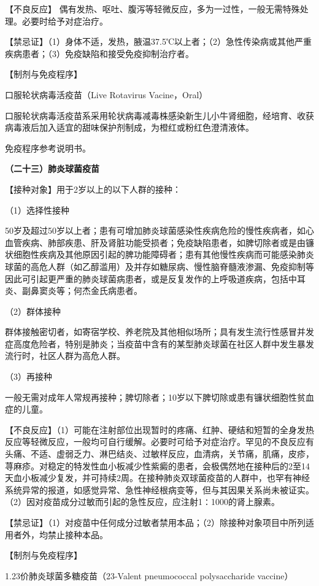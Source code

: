 【不良反应】
偶有发热、呕吐、腹泻等轻微反应，多为一过性，一般无需特殊处理。必要时给予对症治疗。

【禁忌证】（1）身体不适，发热，腋温37.5℃以上者；（2）急性传染病或其他严重疾病患者；（3）免疫缺陷和接受免疫抑制治疗者。

【制剂与免疫程序】

口服轮状病毒活疫苗（Live Rotavirus Vacine，Oral）

口服轮状病毒活疫苗系采用轮状病毒减毒株感染新生儿小牛肾细胞，经培育、收获病毒液后加入适宜的甜味保护剂制成，为橙红或粉红色澄清液体。

免疫程序参考说明书。

\textbf{（二十三）肺炎球菌疫苗}

【接种对象】用于2岁以上的以下人群的接种：

（1）选择性接种

50岁及超过50岁以上者；患有可增加肺炎球菌感染性疾病危险的慢性疾病者，如心血管疾病、肺部疾患、肝及肾脏功能受损者；免疫缺陷患者，如脾切除者或是由镰状细胞性疾病及其他原因引起的脾功能障碍者；患有其他慢性疾病而可能感染肺炎球菌的高危人群（如乙醇滥用）及并存如糖尿病、慢性脑脊髓液渗漏、免疫抑制等因此可引起更严重的肺炎球菌病患者，或是反复发作的上呼吸道疾病，包括中耳炎、副鼻窦炎等；何杰金氏病患者。

（2）群体接种

群体接触密切者，如寄宿学校、养老院及其他相似场所；具有发生流行性感冒并发症高度危险者，特别是肺炎；当疫苗中含有的某型肺炎球菌在社区人群中发生暴发流行时，社区人群为高危人群。

（3）再接种

一般无需对成年人常规再接种；脾切除者；10岁以下脾切除或患有镰状细胞性贫血症的儿童。

【不良反应】（1）可能在注射部位出现暂时的疼痛、红肿、硬结和短暂的全身发热反应等轻微反应，一般均可自行缓解。必要时可给予对症治疗。罕见的不良反应有头痛、不适、虚弱乏力、淋巴结炎、过敏样反应，血清病，关节痛，肌痛，皮疹，荨麻疹。对稳定的特发性血小板减少性紫癜的患者，会极偶然地在接种后的2至14天血小板减少复发，并可持续2周。在接种肺炎双球菌疫苗的人群中，也罕有神经系统异常的报道，如感觉异常、急性神经根病变等，但与其因果关系尚未被证实。（2）因对疫苗成分过敏而引起的急性反应，应注射1∶1000的肾上腺素。

【禁忌证】（1）对疫苗中任何成分过敏者禁用本品；（2）除接种对象项目中所列适用者外，均禁止接种本品。

【制剂与免疫程序】

1.23价肺炎球菌多糖疫苗（23-Valent pneumococcal polysaccharide vaccine）

